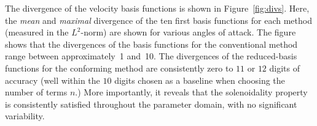 \documentclass[onecolumn, twoside, a4paper, 11pt]{article}
\begin{document}
The divergence of the velocity basis functions is shown in Figure~\ref{fig:divs}. Here, the \emph{mean} and \emph{maximal}
divergence of the ten first basis functions for each method (measured in the $L^2$-norm) are shown
for various angles of attack. The figure shows that the divergences of the basis functions for the
conventional method range between approximately~1 and~10. The divergences of the reduced-basis functions
for the conforming method are
consistently zero to $11$ or $12$ digits of accuracy (well within the $10$ digits chosen as a
baseline when choosing the number of terms $n$.) More importantly, it reveals that the solenoidality
property is consistently satisfied throughout the parameter domain, with no significant variability.

\begin{figure}
  \begin{center}
     \\
\end{center}
\end{figure}
\end{document}
